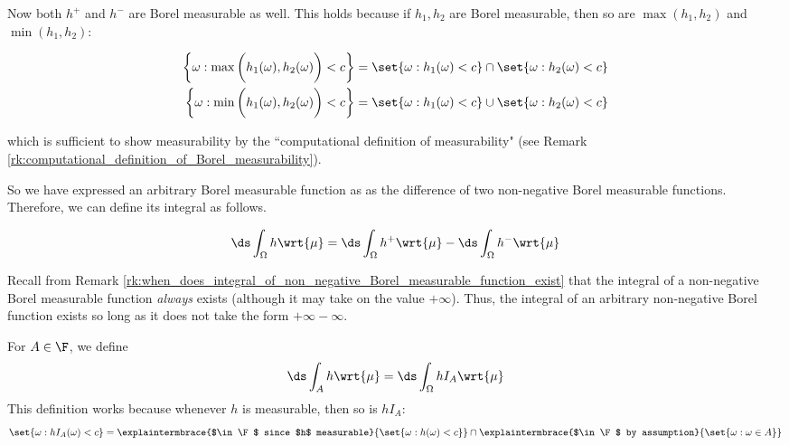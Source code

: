 \documentclass{article} %
\begin{document}
Now both $h^+$ and $h^-$ are Borel measurable as well.  This holds because if $h_1, h_2$ are Borel measurable, then so are $\max(h_1,h_2)$ and $\min(h_1,h_2)$:

\begin{align*}
\bigg\{ \omega : \max \bigg( h_1(\omega), h_2(\omega) \bigg) < c  \bigg\} &=	\set{\omega :  h_1(\omega) < c } \cap \set{\omega : h_2(\omega) < c } \\
\bigg\{ \omega : \min \bigg( h_1(\omega), h_2(\omega) \bigg)  < c \bigg\} &=	\set{\omega :  h_1(\omega) < c } \cup \set{\omega : h_2(\omega) < c }
\end{align*}


which is sufficient to show measurability by the ``computational definition of measurability" (see Remark \ref{rk:computational_definition_of_Borel_measurability}). 

So we have expressed an arbitrary Borel measurable function as as the difference of two non-negative Borel measurable functions. Therefore, we can define its integral as follows.  

\begin{definition}{}
\begin{align} 
 \ds\int_\Omega h \wrt{\mu} = \ds\int_\Omega h^+ \wrt{\mu} - \ds\int_\Omega h^- \wrt{\mu} 
\label{eqn:definition_of_integral_of_arbitrary_borel_measurable_function}
\end{align}
\label{def:integral_of_arbitrary_borel_measurable_function}
\end{definition}




\begin{remark}{}
Recall from Remark \ref{rk:when_does_integral_of_non_negative_Borel_measurable_function_exist} that the integral of a non-negative Borel measurable function \textit{always} exists (although it may take on the value $+\infty$).  Thus, the integral of an arbitrary non-negative Borel function exists so long as it does not take the form $+\infty - \infty$. 
\label{rk:when_does_integral_of_arbitary_Borel_measurable_function_exist}
\end{remark}

\begin{remark}{}
For $A \in \F$, we define 
\[ \ds\int_A h \wrt{\mu} = \ds\int_\Omega  h I_A \wrt{\mu} \]
This definition works because whenever $h$ is measurable, then so is $h I_A$:
\[\set{ \omega : h I_A (\omega) < c } =	\explaintermbrace{$\in \F$ since $h$ measurable}{\set{\omega :  h(\omega) < c }} \cap \explaintermbrace{$\in \F$ by assumption}{\set{\omega : \omega \in A }} \\  \]
 
	
\end{remark}
\end{document}
